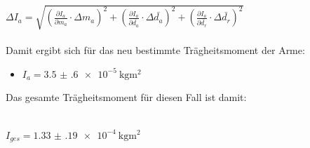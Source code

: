 $\Delta I_a = \sqrt{\left(\frac{\partial I_a}{\partial m_a} \cdot \Delta m_a \right)^2
  + \left(\frac{\partial I_a}{\partial \bar{d_a}} \cdot \Delta \bar{d_a} \right)^2
  + \left(\frac{\partial I_a}{\partial \bar{d_r}} \cdot \Delta \bar{d_r} \right)^2}$\\\\

Damit ergibt sich für das neu bestimmte Trägheitsmoment der Arme:

\begin{itemize}
  \item $I_a = \SI{3.5(6)e-5}{\kilo\gram\meter\squared}$
\end{itemize}

Das gesamte Trägheitsmoment für diesen Fall ist damit:\\\\

\centerline{$I_{ges} = \SI{1.33(19)e-4}{\kilo\gram\meter\squared}$}
